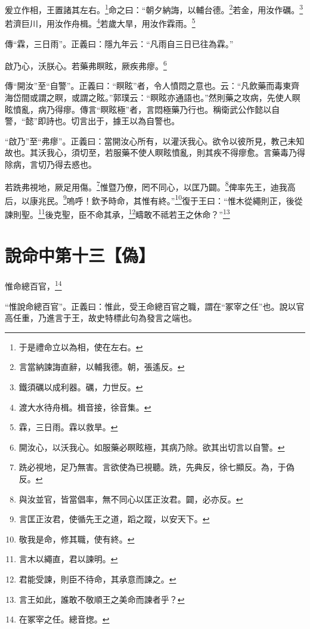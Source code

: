 爰立作相，王置諸其左右。\footnote{于是禮命立以為相，使在左右。}命之曰：“朝夕納誨，以輔台德。\footnote{言當納諫誨直辭，以輔我德。朝，張遙反。}若金，用汝作礪。\footnote{鐵須礪以成利器。礪，力世反。}若濟巨川，用汝作舟楫。\footnote{渡大水待舟楫。楫音接，徐音集。}若歲大旱，用汝作霖雨。\footnote{霖，三日雨。霖以救旱。}

{\noindent\zhuan{}\fzbyks 傳“霖，三日雨”。正義曰：隱九年云：“凡雨自三日已往為霖。” \par}

啟乃心，沃朕心。若藥弗瞑眩，厥疾弗瘳。\footnote{開汝心，以沃我心。如服藥必瞑眩極，其病乃除。欲其出切言以自警。}


{\noindent\zhuan{}\fzbyks 傳“開汝”至“自警”。正義曰：“瞑眩”者，令人憤悶之意也。云：“凡飲藥而毒東齊海岱間或謂之瞑，或謂之眩。”郭璞云：“瞑眩亦通語也。”然則藥之攻病，先使人瞑眩憤亂，病乃得瘳。傳言“瞑眩極”者，言悶極藥乃行也。稱衛武公作懿以自警，“懿”即詩也。切言出于，據王以為自警也。 \par}

{\noindent\shu{}\fzkt “啟乃”至“弗瘳”。正義曰：當開汝心所有，以灌沃我心。欲令以彼所見，教己未知故也。其沃我心，須切至，若服藥不使人瞑眩憤亂，則其疾不得瘳愈。言藥毒乃得除病，言切乃得去惑也。 \par}

若跣弗視地，厥足用傷。\footnote{跣必視地，足乃無害。言欲使為已視聽。跣，先典反，徐七顯反。為，于偽反。}惟暨乃僚，罔不同心，以匡乃闢。\footnote{與汝並官，皆當倡率，無不同心以匡正汝君。闢，必亦反。}俾率先王，迪我高后，以康兆民。\footnote{言匡正汝君，使循先王之道，蹈之蹤，以安天下。}嗚呼！欽予時命，其惟有終。”\footnote{敬我是命，修其職，使有終。}復于王曰：“惟木從繩則正，後從諫則聖。\footnote{言木以繩直，君以諫明。}後克聖，臣不命其承，\footnote{君能受諫，則臣不待命，其承意而諫之。}疇敢不祗若王之休命？”\footnote{言王如此，誰敢不敬順王之美命而諫者乎？}

\section{說命中第十三【偽】}

惟命總百官，\footnote{在冢宰之任。總音揔。}

{\noindent\shu{}\fzkt “惟說命總百官”。正義曰：惟此，受王命總百官之職，謂在“冢宰之任”也。說以官高任重，乃進言于王，故史特標此句為發言之端也。 \par}

